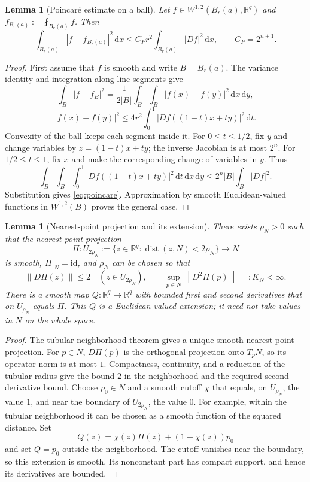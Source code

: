 \documentclass[11pt,a4paper]{article}
\numberwithin{equation}{section}
\newtheorem{lemma}[theorem]{Lemma}
\theoremstyle{definition}
\newcommand{\R}{\mathbb R}
\newcommand{\dd}{\,\mathrm d}
\newcommand{\dx}{\dd x}
\newcommand{\dy}{\dd y}
\newcommand{\dist}{\operatorname{dist}}
\newcommand{\avint}{\mathop{\fint}}
\newcommand{\W}{W^{1,2}}
\newcommand{\norm}[1]{\left\lVert #1\right\rVert}
\begin{document}
\begin{lemma}[Poincaré estimate on a ball]\label{lem:poincare}
Let $f\in\W(B_r(a),\R^q)$ and $f_{B_r(a)}:=\avint_{B_r(a)}f$. Then
\begin{equation}\label{eq:poincare}
\int_{B_r(a)}|f-f_{B_r(a)}|^2\dx
\le C_P r^2\int_{B_r(a)}|Df|^2\dx,
\qquad C_P=2^{n+1}.
\end{equation}
\end{lemma}
\begin{proof}
First assume that $f$ is smooth and write $B=B_r(a)$. The variance identity and integration along line segments give
\[
\int_B|f-f_B|^2
=\frac1{2|B|}\int_B\int_B|f(x)-f(y)|^2\dx\dy,
\]
\[
|f(x)-f(y)|^2\le4r^2\int_0^1|Df((1-t)x+ty)|^2\dd t.
\]
Convexity of the ball keeps each segment inside it. For $0\le t\le1/2$, fix $y$ and change variables by $z=(1-t)x+ty$; the inverse Jacobian is at most $2^n$. For $1/2\le t\le1$, fix $x$ and make the corresponding change of variables in $y$. Thus
\[
\int_B\int_B\int_0^1|Df((1-t)x+ty)|^2\dd t\dx\dy
\le2^n|B|\int_B|Df|^2.
\]
Substitution gives \eqref{eq:poincare}. Approximation by smooth Euclidean-valued functions in $\W(B)$ proves the general case.
\end{proof}

\begin{lemma}[Nearest-point projection and its extension]\label{lem:projection}
There exists $\rho_N>0$ such that the nearest-point projection
\[
\Pi:U_{2\rho_N}:=\{z\in\R^q:\dist(z,N)<2\rho_N\}\longrightarrow N
\]
is smooth, $\Pi|_N=\mathrm{id}$, and $\rho_N$ can be chosen so that
\[
\norm{D\Pi(z)}\le2\quad(z\in U_{2\rho_N}),
\qquad \sup_{p\in N}\norm{D^2\Pi(p)}=:K_N<\infty.
\]
There is a smooth map $Q:\R^q\to\R^q$ with bounded first and second derivatives that on $U_{\rho_N}$ equals $\Pi$. This $Q$ is a Euclidean-valued extension; it need not take values in $N$ on the whole space.
\end{lemma}
\begin{proof}
The tubular neighborhood theorem gives a unique smooth nearest-point projection. For $p\in N$, $D\Pi(p)$ is the orthogonal projection onto $T_pN$, so its operator norm is at most $1$. Compactness, continuity, and a reduction of the tubular radius give the bound $2$ in the neighborhood and the required second derivative bound. Choose $p_0\in N$ and a smooth cutoff $\chi$ that equals, on $U_{\rho_N}$, the value $1$, and near the boundary of $U_{2\rho_N}$, the value $0$. For example, within the tubular neighborhood it can be chosen as a smooth function of the squared distance. Set
\[
Q(z)=\chi(z)\Pi(z)+(1-\chi(z))p_0
\]
and set $Q=p_0$ outside the neighborhood. The cutoff vanishes near the boundary, so this extension is smooth. Its nonconstant part has compact support, and hence its derivatives are bounded.
\end{proof}
\end{document}
